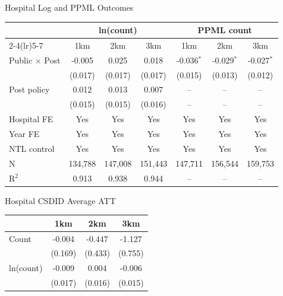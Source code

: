 \documentclass{beamer}
\begin{document}
\begin{frame}{Hospital Log and PPML Outcomes}

\centering
\scriptsize
\setlength{\tabcolsep}{5pt}

\begin{tabular}{lcccccc}
\toprule
& \multicolumn{3}{c}{ln(count)} & \multicolumn{3}{c}{PPML count} \\
\cmidrule(lr){2-4}\cmidrule(lr){5-7}
& 1km & 2km & 3km & 1km & 2km & 3km \\
\midrule
Public $\times$ Post
& -0.005 & 0.025 & 0.018
& -0.036$^{*}$ & -0.029$^{*}$ & -0.027$^{*}$ \\
& (0.017) & (0.017) & (0.017)
& (0.015) & (0.013) & (0.012) \\
\addlinespace
Post policy
& 0.012 & 0.013 & 0.007
& -- & -- & -- \\
& (0.015) & (0.015) & (0.016)
& -- & -- & -- \\
\midrule
Hospital FE & Yes & Yes & Yes & Yes & Yes & Yes \\
Year FE & Yes & Yes & Yes & Yes & Yes & Yes \\
NTL control & Yes & Yes & Yes & Yes & Yes & Yes \\
\midrule
N & 134,788 & 147,008 & 151,443 & 147,711 & 156,544 & 159,753 \\
R$^2$ & 0.913 & 0.938 & 0.944 & -- & -- & -- \\
\bottomrule
\end{tabular}

\end{frame}

\begin{frame}{Hospital CSDID Average ATT}

\centering
\scriptsize
\setlength{\tabcolsep}{7pt}

\begin{tabular}{lccc}
\toprule
& 1km & 2km & 3km \\
\midrule
Count
& -0.004 & -0.447 & -1.127 \\
& (0.169) & (0.433) & (0.755) \\
\addlinespace
ln(count)
& -0.009 & 0.004 & -0.006 \\
& (0.017) & (0.016) & (0.015) \\
\bottomrule
\end{tabular}

\end{frame}
\end{document}
